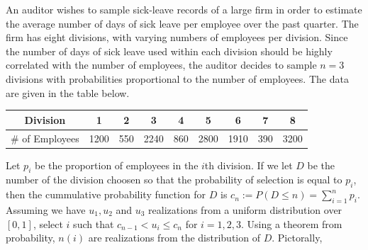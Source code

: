 \documentclass[usenames,dvipsnames]{homework}
\begin{document}
\begin{longproblem}An auditor wishes to sample sick-leave records of a large firm in order to estimate the average number of days of sick leave per employee over the past quarter.  The firm has eight divisions, with varying numbers of employees per division.  Since the number of days of sick leave used within each division should be highly correlated with the number of employees, the auditor decides to sample $n=3$ divisions with probabilities proportional to the number of employees.  The data are given in the table below.

\begin{center}
\renewcommand{\arraystretch}{1.3}
\begin{tabular}{c | c c c c c c c c } 
Division	& 1    & 2   & 3    & 4   & 5    & 6    & 7   & 8    \\\hline
\# of Employees & 1200 & 550 & 2240 & 860 & 2800 & 1910 & 390 & 3200 \\
\end{tabular}
\end{center}
\end{longproblem}

\begin{solution}
  Let $p_i$ be the proportion of employees in the $i$th division.  If we let $D$ be the number of the division choosen so that the probability of selection is equal to $p_i$, then the cummulative probability function for $D$ is $c_n:=P(D\le n) = \sum_{i=1}^n p_i$. Assuming we have $u_1,u_2$ and $u_3$ realizations from a uniform distribution over $[0,1]$, select $i$ such that $c_{n-1} < u_i \le c_{n}$ for $i=1,2,3$.  Using a theorem from probability, $n(i)$ are realizations from the distribution of $D$. Pictorally,
  \begin{center}
  \end{center}

\end{solution}
\end{document}

